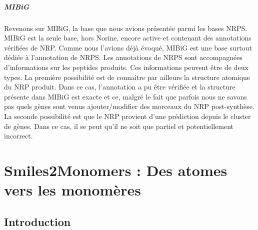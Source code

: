 \documentclass[12pt,french,twoside]{report}
\begin{document}
\paragraph{MIBiG}Revenons sur MIBiG, la base que nous avions présentée parmi les bases NRPS.
MIBiG est la seule base, hors Norine, encore active et contenant des annotations vérifiées de NRP.
Comme nous l'avions déjà évoqué, MIBiG est une base surtout dédiée à l'annotation de NRPS.
Les annotations de NRPS sont accompagnées d'informations sur les peptides produits.
Ces informations peuvent être de deux types.
La première possibilité est de connaître par ailleurs la structure atomique du NRP produit.
Dans ce cas, l'annotation a pu être vérifiée et la structure présente dans MIBiG est exacte et ce, malgré le fait que parfois nous ne savons pas quels gènes sont venus ajouter/modifier des morceaux du NRP post-synthèse.
La seconde possibilité est que le NRP provient d'une prédiction depuis le cluster de gènes.
Dans ce cas, il se peut qu'il ne soit que partiel et potentiellement incorrect.
























\chapter{Smiles2Monomers : Des atomes vers les monomères}

\section{Introduction}
\end{document}
